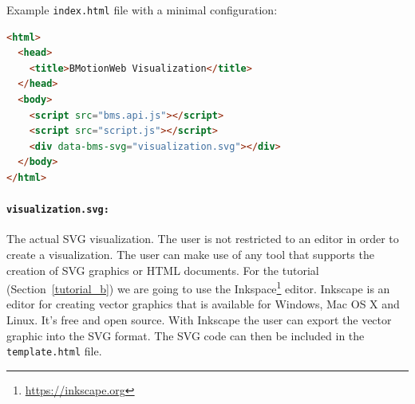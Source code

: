 Example \texttt{index.html} file with a minimal configuration:

\begin{lstlisting}[language=html]
<html>
  <head>
    <title>BMotionWeb Visualization</title>
  </head>
  <body>
    <script src="bms.api.js"></script>
    <script src="script.js"></script>
    <div data-bms-svg="visualization.svg"></div>
  </body>
</html>
\end{lstlisting}


\paragraph{\texttt{visualization.svg:}}


The actual SVG visualization.
The user is not restricted to an editor in order to create a visualization.
The user can make use of any tool that supports the creation of SVG graphics or HTML documents.
For the tutorial (Section~\ref{tutorial_b}) we are going to use the Inkspace\footnote{\url{https://inkscape.org}} editor. Inkscape is an editor for creating vector graphics that is available for Windows, Mac OS X and Linux.
It's free and open source.
With Inkscape the user can export the vector graphic into the SVG format.
The SVG code can then be included in the \texttt{template.html} file.


